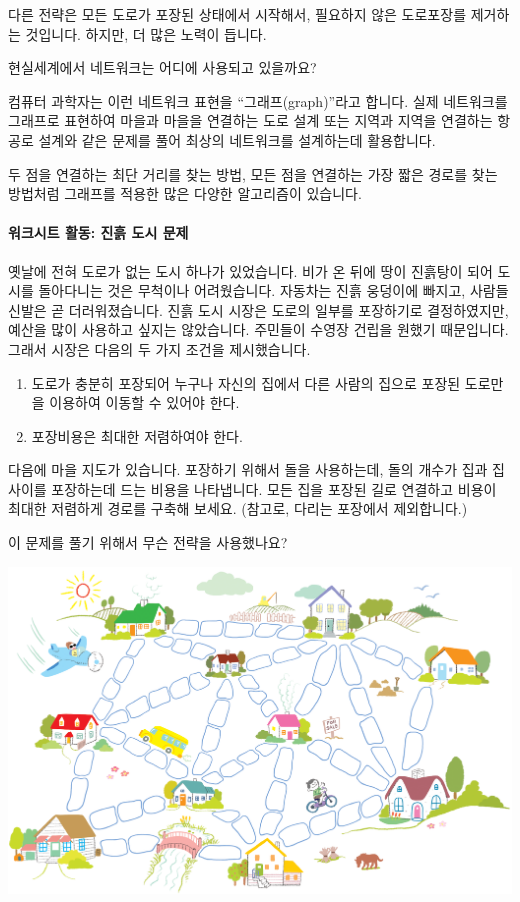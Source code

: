 \documentclass[]{article}
\begin{document}
다른 전략은 모든 도로가 포장된 상태에서 시작해서, 필요하지 않은
도로포장를 제거하는 것입니다. 하지만, 더 많은 노력이 듭니다.

현실세계에서 네트워크는 어디에 사용되고 있을까요?

컴퓨터 과학자는 이런 네트워크 표현을 ``그래프(graph)''라고 합니다. 실제
네트워크를 그래프로 표현하여 마을과 마을을 연결하는 도로 설계 또는
지역과 지역을 연결하는 항공로 설계와 같은 문제를 풀어 최상의 네트워크를
설계하는데 활용합니다.

두 점을 연결하는 최단 거리를 찾는 방법, 모든 점을 연결하는 가장 짧은
경로를 찾는 방법처럼 그래프를 적용한 많은 다양한 알고리즘이 있습니다.

\mbox{}\paragraph{워크시트 활동: 진흙 도시 문제}\label{section-129}

옛날에 전혀 도로가 없는 도시 하나가 있었습니다. 비가 온 뒤에 땅이
진흙탕이 되어 도시를 돌아다니는 것은 무척이나 어려웠습니다. 자동차는
진흙 웅덩이에 빠지고, 사람들 신발은 곧 더러워졌습니다. 진흙 도시 시장은
도로의 일부를 포장하기로 결정하였지만, 예산을 많이 사용하고 싶지는
않았습니다. 주민들이 수영장 건립을 원했기 때문입니다. 그래서 시장은
다음의 두 가지 조건을 제시했습니다.

\begin{enumerate}
\itemsep1pt\parskip0pt
\item
  도로가 충분히 포장되어 누구나 자신의 집에서 다른 사람의 집으로 포장된
  도로만을 이용하여 이동할 수 있어야 한다.
\item
  포장비용은 최대한 저렴하여야 한다.
\end{enumerate}

다음에 마을 지도가 있습니다. 포장하기 위해서 돌을 사용하는데, 돌의
개수가 집과 집 사이를 포장하는데 드는 비용을 나타냅니다. 모든 집을
포장된 길로 연결하고 비용이 최대한 저렴하게 경로를 구축해 보세요.
(참고로, 다리는 포장에서 제외합니다.)

이 문제를 풀기 위해서 무슨 전략을 사용했나요?

\includegraphics{csunplugged/02-part/img/ch09-spanning-tree/09-spanning-tree-01-muddy-city-problem.png}
\end{document}
